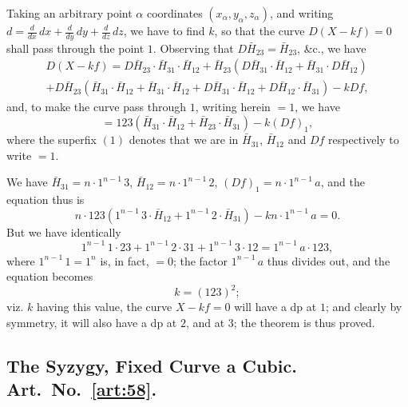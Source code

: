 \documentclass[11pt,a4paper]{book}
\begin{document}
\begin{art}\label{art:57}
Taking an arbitrary point $\alpha$ coordinates $(x_\alpha, y_\alpha, z_\alpha)$, and writing $d = \frac{d}{dx}\,dx + \frac{d}{dy}\,dy + \frac{d}{dz}\,dz$, we have to find $k$, so that the curve $D(X - kf) = 0$ shall pass through the point $1$. Observing that $D\bar{H}_{23} = \bar{H}_{23}$, \&c., we have
\begin{multline*}
D(X - kf) = D\bar{H}_{23} \cdot \bar{H}_{31} \cdot \bar{H}_{12} + \bar{H}_{23}(D\bar{H}_{31} \cdot \bar{H}_{12} + \bar{H}_{31} \cdot D\bar{H}_{12}) \\
+ D\bar{H}_{23}(\bar{H}_{31} \cdot \bar{H}_{12} + \bar{H}_{31} \cdot \bar{H}_{12} + D\bar{H}_{31} \cdot \bar{H}_{12} + D\bar{H}_{12} \cdot \bar{H}_{31}) - kDf,
\end{multline*}
and, to make the curve pass through $1$, writing herein $= 1$, we have
\[
= 123(\bar{H}_{31} \cdot \bar{H}_{12} + \bar{H}_{23} \cdot \bar{H}_{31}) - k(Df)_1,
\]
where the superfix $(1)$ denotes that we are in $\bar{H}_{31}$, $\bar{H}_{12}$ and $Df$ respectively to write $= 1$.

We have $\bar{H}_{31} = n \cdot 1^{n-1}\,3$, $\bar{H}_{12} = n \cdot 1^{n-1}\,2$, $(Df)_1 = n \cdot 1^{n-1}\,a$, and the equation thus is
\[
n \cdot 123(1^{n-1}\,3 \cdot \bar{H}_{12} + 1^{n-1}\,2 \cdot \bar{H}_{31}) - kn \cdot 1^{n-1}\,a = 0.
\]
But we have identically
\[
1^{n-1}\,1 \cdot 23 + 1^{n-1}\,2 \cdot 31 + 1^{n-1}\,3 \cdot 12 = 1^{n-1}\,a \cdot 123,
\]
where $1^{n-1}\,1 = 1^n$ is, in fact, $= 0$; the factor $1^{n-1}\,a$ thus divides out, and the equation becomes
\[
k = (123)^2;
\]
viz. $k$ having this value, the curve $X - kf = 0$ will have a dp at $1$; and clearly by symmetry, it will also have a dp at $2$, and at $3$; the theorem is thus proved.
\end{art}

\newpage
\subsection*{The Syzygy, Fixed Curve a Cubic. Art.~No.~\ref{art:58}.}
\end{document}
